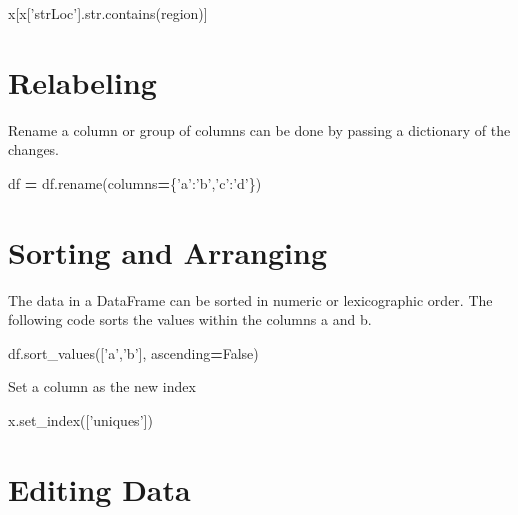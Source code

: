 \documentclass[]{book}
\newenvironment{Shaded}{\begin{snugshade}}{\end{snugshade}}
\newcommand{\BuiltInTok}[1]{#1}
\newcommand{\NormalTok}[1]{#1}
\newcommand{\OperatorTok}[1]{\textcolor[rgb]{0.81,0.36,0.00}{\textbf{#1}}}
\newcommand{\StringTok}[1]{\textcolor[rgb]{0.31,0.60,0.02}{#1}}
\newcommand{\VariableTok}[1]{\textcolor[rgb]{0.00,0.00,0.00}{#1}}
\begin{document}
\begin{Shaded}
\begin{Highlighting}[]
\NormalTok{x[x[}\StringTok{'strLoc'}\NormalTok{].}\BuiltInTok{str}\NormalTok{.contains(region)]}
\end{Highlighting}
\end{Shaded}

\hypertarget{relabeling}{%
\section{Relabeling}\label{relabeling}}

Rename a column or group of columns can be done by passing a dictionary of the changes.

\begin{Shaded}
\begin{Highlighting}[]
\NormalTok{    df }\OperatorTok{=}\NormalTok{ df.rename(columns}\OperatorTok{=}\NormalTok{\{}\StringTok{'a'}\NormalTok{:}\StringTok{'b'}\NormalTok{,}\StringTok{'c'}\NormalTok{:}\StringTok{'d'}\NormalTok{\})}
\end{Highlighting}
\end{Shaded}

\hypertarget{sorting-and-arranging}{%
\section{Sorting and Arranging}\label{sorting-and-arranging}}

The data in a DataFrame can be sorted in numeric or lexicographic order.
The following code sorts the values within the columns a and b.

\begin{Shaded}
\begin{Highlighting}[]
\NormalTok{df.sort_values([}\StringTok{'a'}\NormalTok{,}\StringTok{'b'}\NormalTok{], ascending}\OperatorTok{=}\VariableTok{False}\NormalTok{)}
\end{Highlighting}
\end{Shaded}

Set a column as the new index

\begin{Shaded}
\begin{Highlighting}[]
\NormalTok{x.set_index([}\StringTok{'uniques'}\NormalTok{])}
\end{Highlighting}
\end{Shaded}

\hypertarget{editing-data}{%
\section{Editing Data}\label{editing-data}}
\end{document}
